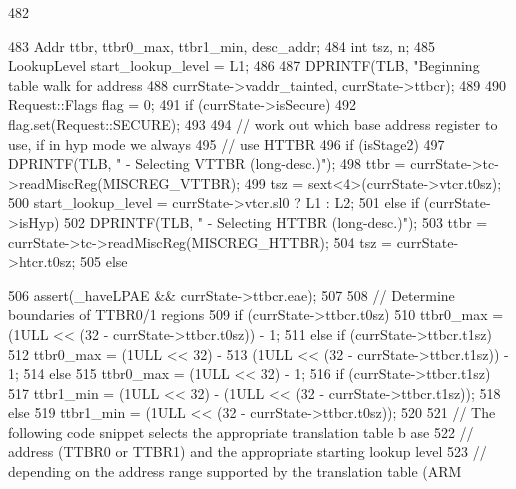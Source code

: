 \begin{DoxyCode}
482 {
483     Addr ttbr, ttbr0_max, ttbr1_min, desc_addr;
484     int tsz, n;
485     LookupLevel start_lookup_level = L1;
486 
487     DPRINTF(TLB, "Beginning table walk for address %
488             currState->vaddr_tainted, currState->ttbcr);
489 
490     Request::Flags flag = 0;
491     if (currState->isSecure)
492         flag.set(Request::SECURE);
493 
494     // work out which base address register to use, if in hyp mode we always
495     // use HTTBR
496     if (isStage2) {
497         DPRINTF(TLB, " - Selecting VTTBR (long-desc.)\n");
498         ttbr = currState->tc->readMiscReg(MISCREG_VTTBR);
499         tsz  = sext<4>(currState->vtcr.t0sz);
500         start_lookup_level = currState->vtcr.sl0 ? L1 : L2;
501     } else if (currState->isHyp) {
502         DPRINTF(TLB, " - Selecting HTTBR (long-desc.)\n");
503         ttbr = currState->tc->readMiscReg(MISCREG_HTTBR);
504         tsz  = currState->htcr.t0sz;
505     } else {
506         assert(_haveLPAE && currState->ttbcr.eae);
507 
508         // Determine boundaries of TTBR0/1 regions
509         if (currState->ttbcr.t0sz)
510             ttbr0_max = (1ULL << (32 - currState->ttbcr.t0sz)) - 1;
511         else if (currState->ttbcr.t1sz)
512             ttbr0_max = (1ULL << 32) -
513                 (1ULL << (32 - currState->ttbcr.t1sz)) - 1;
514         else
515             ttbr0_max = (1ULL << 32) - 1;
516         if (currState->ttbcr.t1sz)
517             ttbr1_min = (1ULL << 32) - (1ULL << (32 - currState->ttbcr.t1sz));
518         else
519             ttbr1_min = (1ULL << (32 - currState->ttbcr.t0sz));
520 
521         // The following code snippet selects the appropriate translation table b
      ase
522         // address (TTBR0 or TTBR1) and the appropriate starting lookup level
523         // depending on the address range supported by the translation table (ARM
      
}}
\end{DoxyCode}
